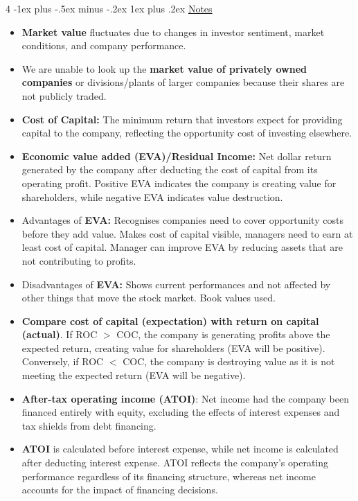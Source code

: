 \documentclass[10pt, landscape]{article}
\makeatletter
\renewcommand{\subsubsection}{\@startsection{subsubsection}{3}{0mm}%
  {-1ex plus -.5ex minus -.2ex}%
  {1ex plus .2ex}%
{\normalfont\small\bfseries}}%
\makeatother
\begin{document}
\begin{multicols*}{4}
    \subsubsection{\underline{Notes}}
    \begin{itemize}
      \item \textbf{Market value} fluctuates due to changes in investor sentiment, market conditions, and company performance.
      \item We are unable to look up the \textbf{market value of privately owned companies} or divisions/plants of larger companies because their shares are not publicly traded.
      \item \textbf{Cost of Capital:} The minimum return that investors expect for providing capital to the company, reflecting the opportunity cost of investing elsewhere.
      \item \textbf{Economic value added (EVA)/Residual Income:} Net dollar return generated by the company after deducting the cost of capital from its operating profit. Positive EVA indicates the company is creating value for shareholders, while negative EVA indicates value destruction.
      \item Advantages of \textbf{EVA:} Recognises companies need to cover opportunity costs before they add value. Makes cost of capital visible, managers need to earn at least cost of capital. Manager can improve EVA by reducing assets that are not contributing to profits. 
      \item Disadvantages of \textbf{EVA:} Shows current performances and not affected by other things that move the stock market. Book values used.
      \item \textbf{Compare cost of capital (expectation) with return on capital (actual)}. If ROC $>$ COC, the company is generating profits above the expected return, creating value for shareholders (EVA will be positive). Conversely, if ROC $<$ COC, the company is destroying value as it is not meeting the expected return (EVA will be negative).
      \item \textbf{After-tax operating income (ATOI)}: Net income had the company been financed entirely with equity, excluding the effects of interest expenses and tax shields from debt financing.
      \item \textbf{ATOI} is calculated before interest expense, while net income is calculated after deducting interest expense. ATOI reflects the company's operating performance regardless of its financing structure, whereas net income accounts for the impact of financing decisions.

\end{itemize}
\end{multicols*}
\end{document}
